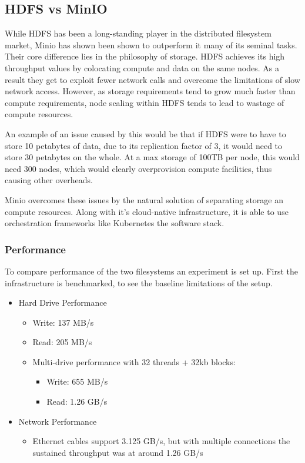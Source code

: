 \documentclass{article}
\begin{document}
\subsection{HDFS vs MinIO}


While HDFS has been a long-standing player in the distributed filesystem market, Minio has shown been shown to outperform it many of its seminal tasks. Their core difference lies in the philosophy of storage. HDFS achieves its high throughput values by colocating compute and data on the same nodes. As a result they get to exploit fewer network calls and overcome the limitations of slow network access. However, as storage requirements tend to grow much faster than compute requirements, node scaling within HDFS tends to lead to wastage of compute resources.

An example of an issue caused by this would be that if HDFS were to have to store 10 petabytes of data, due to its replication factor of 3, it would need to store 30 petabytes on the whole. At a max storage of 100TB per node, this would need 300 nodes, which would clearly overprovision compute facilities, thus causing other overheads. 

Minio overcomes these issues by the natural solution of separating storage an compute resources. Along with it's cloud-native infrastructure, it is able to use orchestration frameworks like Kubernetes the software stack.

\subsubsection{Performance}
To compare performance of the two filesystems an experiment is set up. First the infrastructure is benchmarked, to see the baseline limitations of the setup.
\begin{itemize}
    \item Hard Drive Performance
        \begin{itemize}
            \item Write: 137 MB/s
            \item Read: 205 MB/s
            \item Multi-drive performance with 32 threads + 32kb blocks:
                \begin{itemize}
                    \item Write: 655 MB/s
                    \item Read: 1.26 GB/s
                \end{itemize}
        \end{itemize}
    \item Network Performance
        \begin{itemize}
            \item Ethernet cables support 3.125 GB/s, but with multiple connections the sustained throughput was at around 1.26 GB/s
        \end{itemize}
\end{itemize}
\end{document}
